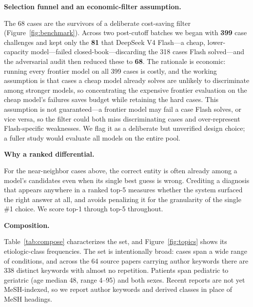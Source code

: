 \documentclass{article}
\renewcommand{\paragraph}[1]{%
  \par\addvspace{0.42\baselineskip}%
  \noindent\textbf{#1}\par\nobreak\vspace{-0.28\baselineskip}%
}
\begin{document}
\paragraph{Selection funnel and an economic-filter assumption.} The 68 cases are the survivors of a
deliberate cost-saving filter (Figure~\ref{fig:benchmark}). Across two post-cutoff batches we began with
\textbf{399} case challenges and kept only the \textbf{81} that DeepSeek V4 Flash---a cheap, lower-capacity
model---failed closed-book---discarding the 318 cases Flash solved---and the adversarial audit then reduced these to \textbf{68}. The rationale is
economic: running every frontier model on all 399 cases is costly, and the working assumption is that cases
a cheap model already solves are unlikely to discriminate among stronger models, so concentrating the
expensive frontier evaluation on the cheap model's failures saves budget while retaining the hard cases.
This assumption is not guaranteed---a frontier model may fail a case Flash solves, or vice versa, so the
filter could both miss discriminating cases and over-represent Flash-specific weaknesses. We flag it as a
deliberate but unverified design choice; a fuller study would evaluate all models on the entire pool.

\paragraph{Why a ranked differential.} For the near-neighbor cases above, the correct entity is often
already among a model's candidates even when its single best guess is wrong. Crediting a diagnosis that
appears anywhere in a ranked top-5 measures whether the system surfaced the right answer at all, and avoids
penalizing it for the granularity of the single \#1 choice. We score top-1 through top-5 throughout.

\paragraph{Composition.} Table~\ref{tab:compose} characterizes the set, and Figure~\ref{fig:topics} shows
its etiologic-class frequencies. The set is intentionally broad: cases span a wide range of conditions, and
across the 64 source papers carrying author keywords there are 338 distinct keywords with almost no
repetition. Patients
span pediatric to geriatric (age median 48, range 4--95) and both sexes. Recent reports are not yet
MeSH-indexed, so we report author keywords and derived classes in place of MeSH headings.
\end{document}
